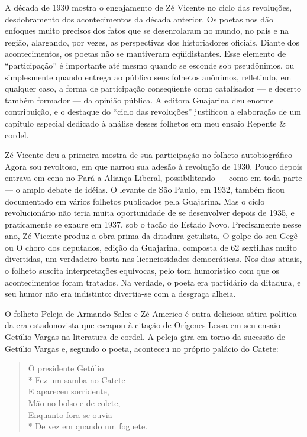 A década de 1930 mostra o engajamento de Zé Vicente no ciclo das
revoluções, desdobramento dos acontecimentos da década anterior. Os
poetas nos dão enfoques muito precisos dos fatos que se desenrolaram
no mundo, no país e na região, alargando, por vezes, as perspectivas
dos historiadores oficiais. Diante dos acontecimentos, os poetas não
se mantiveram eqüidistantes. Esse elemento de “participação” é
importante até mesmo quando se esconde sob pseudônimos, ou
simplesmente quando entrega ao público seus folhetos anônimos,
refletindo, em qualquer caso, a forma de participação conseqüente
como catalisador --- e decerto também formador --- da opinião pública. A
editora Guajarina deu enorme contribuição, e o destaque do “ciclo das
revoluções” justificou a elaboração de um capítulo especial dedicado
à análise desses folhetos em meu ensaio Repente \& cordel. 

Zé Vicente deu a primeira mostra de sua participação no folheto
autobiográfico Agora sou revoltoso, em que narrou sua adesão à
revolução de 1930. Pouco depois entrava em cena no Pará a Aliança
Liberal, possibilitando --- como em toda parte --- o amplo debate de
idéias. O levante de São Paulo, em 1932, também ficou documentado em
vários folhetos publicados pela Guajarina. Mas o ciclo revolucionário
não teria muita oportunidade de se desenvolver depois de 1935, e
praticamente se exaure em 1937, sob o tacão do Estado Novo.
Precisamente nesse ano, Zé Vicente produz a obra-prima da ditadura
getulista, O golpe do seu Gegê ou O choro dos deputados, edição da
Guajarina, composta de 62 sextilhas muito divertidas, um verdadeiro
basta nas licenciosidades democráticas. Nos dias atuais, o folheto
suscita interpretações equívocas, pelo tom humorístico com que os
acontecimentos foram tratados. Na verdade, o poeta era partidário da
ditadura, e seu humor não era indistinto: divertia-se com a desgraça
alheia.

O folheto Peleja de Armando Sales e Zé Americo é outra deliciosa
sátira política da era estadonovista que escapou à citação de
Orígenes Lessa em seu ensaio Getúlio Vargas na literatura de cordel.
A peleja gira em torno da sucessão de Getúlio Vargas e, segundo o
poeta, aconteceu no próprio palácio do Catete: 

\begin{verse}
O presidente Getúlio\\*
Fez um samba no Catete\\
E apareceu sorridente,\\
Mão no bolso e de colete,\\
Enquanto fora se ouvia\\*
De vez em quando um foguete.
\end{verse}

